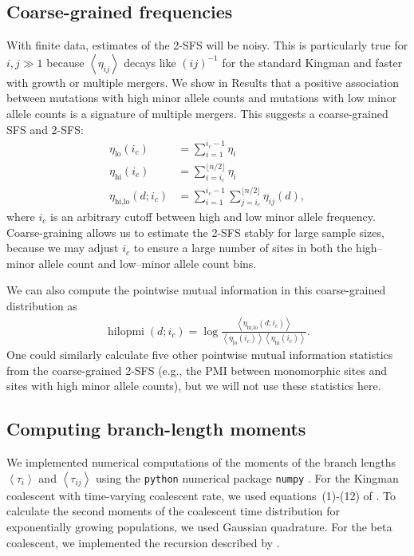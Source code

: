 \documentclass[11pt, letterpaper]{article}   	%
\newcommand{\floor}[1]{\lfloor #1 \rfloor}
\newcommand{\E}[1]{\left< #1 \right>}
\DeclareMathOperator{\hilopmi}{hilopmi}
\begin{document}
\subsection*{Coarse-grained frequencies}

With finite data, estimates of the 2-SFS will be noisy.
This is particularly true for $i,j\gg1$ because $\E{\eta_{ij}}$ decays like $(ij)^{-1}$ for the standard Kingman \autocite{Fu1995} and faster with growth or multiple mergers.
We show in Results that a positive association between mutations with high minor allele counts and mutations with low minor allele counts is a signature of multiple mergers.
This suggests a coarse-grained SFS and 2-SFS:
\begin{align}
    \eta_{\text{lo}}(i_c) &= \sum_{i=1}^{i_c-1} \eta_i \\
    \eta_{\text{hi}}(i_c) &= \sum_{i=i_c}^{\floor{n/2}} \eta_i \\
    \eta_{\text{hi,lo}}(d; i_c) &= \sum_{i=1}^{i_c-1} \sum_{j=i_c}^{\floor{n/2}} \eta_{ij}(d),
\end{align}
where $i_c$ is an arbitrary cutoff between high and low minor allele frequency.
Coarse-graining allows us to estimate the 2-SFS stably for large sample sizes, because we may adjust $i_c$ to ensure a large number of sites in both the high--minor allele count and low--minor allele count bins.

We can also compute the pointwise mutual information in this coarse-grained distribution as
\begin{align}
    \hilopmi(d; i_c) = \log \frac
                                {\E{\eta_{\text{hi,lo}}(d; i_c)}}
                                {\E{\eta_{\text{lo}}(i_c)}  \E{\eta_{\text{hi}}(i_c)}}.
\end{align}
One could similarly calculate five other pointwise mutual information statistics from the coarse-grained 2-SFS (e.g., the PMI between monomorphic sites and sites with high minor allele counts), but we will not use these statistics here.

\subsection*{Computing branch-length moments}

We implemented numerical computations of the moments of the branch lengths $\E{\tau_i}$ and $\E{\tau_{ij}}$ using the \texttt{python} numerical package \texttt{numpy} \autocite{numpy}.
For the Kingman coalescent with time-varying coalescent rate, we used equations~(1)-(12) of \cite{ZivkovicWiehe2008}.
To calculate the second moments of the coalescent time distribution for exponentially growing populations, we used Gaussian quadrature.
For the beta coalescent, we implemented the recursion described by \cite{BirknerEtAl2013}.
\end{document}
